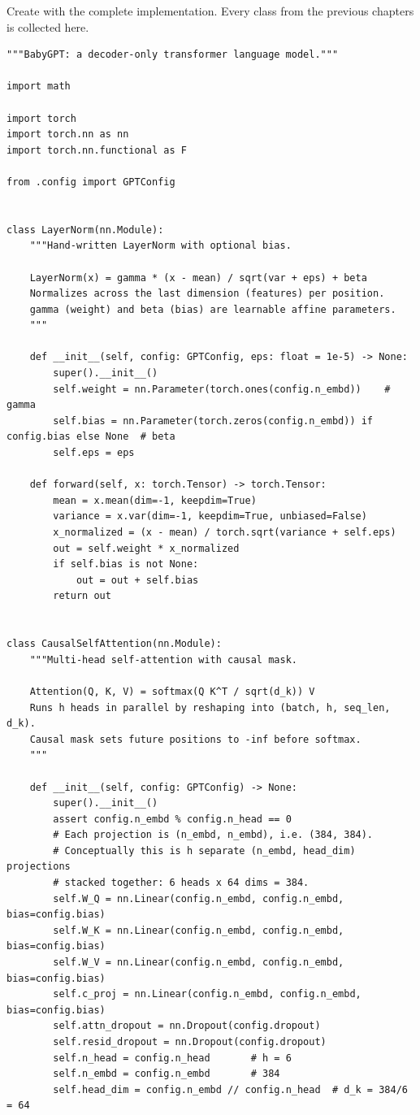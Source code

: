 Create  with the complete implementation. Every class from the previous chapters is collected here.

\begin{lstlisting}
"""BabyGPT: a decoder-only transformer language model."""

import math

import torch
import torch.nn as nn
import torch.nn.functional as F

from .config import GPTConfig


class LayerNorm(nn.Module):
    """Hand-written LayerNorm with optional bias.

    LayerNorm(x) = gamma * (x - mean) / sqrt(var + eps) + beta
    Normalizes across the last dimension (features) per position.
    gamma (weight) and beta (bias) are learnable affine parameters.
    """

    def __init__(self, config: GPTConfig, eps: float = 1e-5) -> None:
        super().__init__()
        self.weight = nn.Parameter(torch.ones(config.n_embd))    # gamma
        self.bias = nn.Parameter(torch.zeros(config.n_embd)) if config.bias else None  # beta
        self.eps = eps

    def forward(self, x: torch.Tensor) -> torch.Tensor:
        mean = x.mean(dim=-1, keepdim=True)
        variance = x.var(dim=-1, keepdim=True, unbiased=False)
        x_normalized = (x - mean) / torch.sqrt(variance + self.eps)
        out = self.weight * x_normalized
        if self.bias is not None:
            out = out + self.bias
        return out


class CausalSelfAttention(nn.Module):
    """Multi-head self-attention with causal mask.

    Attention(Q, K, V) = softmax(Q K^T / sqrt(d_k)) V
    Runs h heads in parallel by reshaping into (batch, h, seq_len, d_k).
    Causal mask sets future positions to -inf before softmax.
    """

    def __init__(self, config: GPTConfig) -> None:
        super().__init__()
        assert config.n_embd % config.n_head == 0
        # Each projection is (n_embd, n_embd), i.e. (384, 384).
        # Conceptually this is h separate (n_embd, head_dim) projections
        # stacked together: 6 heads x 64 dims = 384.
        self.W_Q = nn.Linear(config.n_embd, config.n_embd, bias=config.bias)
        self.W_K = nn.Linear(config.n_embd, config.n_embd, bias=config.bias)
        self.W_V = nn.Linear(config.n_embd, config.n_embd, bias=config.bias)
        self.c_proj = nn.Linear(config.n_embd, config.n_embd, bias=config.bias)
        self.attn_dropout = nn.Dropout(config.dropout)
        self.resid_dropout = nn.Dropout(config.dropout)
        self.n_head = config.n_head       # h = 6
        self.n_embd = config.n_embd       # 384
        self.head_dim = config.n_embd // config.n_head  # d_k = 384/6 = 64


\end{lstlisting}
